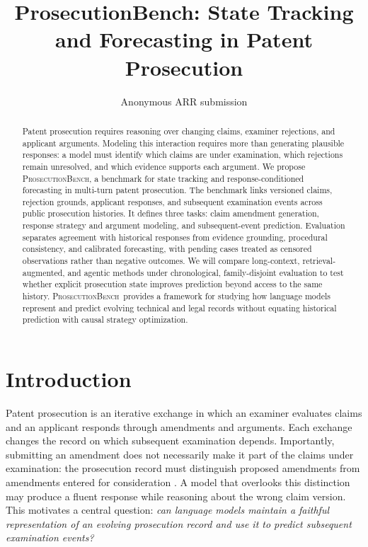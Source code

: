\documentclass[11pt]{article}
\title{ProsecutionBench: State Tracking and Forecasting in Patent Prosecution}
\author{Anonymous ARR submission}
\newcommand{\bench}{\textsc{ProsecutionBench}}
\begin{document}
\maketitle

\begin{abstract}
Patent prosecution requires reasoning over changing claims, examiner rejections, and applicant arguments. Modeling this interaction requires more than generating plausible responses: a model must identify which claims are under examination, which rejections remain unresolved, and which evidence supports each argument. We propose \bench, a benchmark for state tracking and response-conditioned forecasting in multi-turn patent prosecution. The benchmark links versioned claims, rejection grounds, applicant responses, and subsequent examination events across public prosecution histories. It defines three tasks: claim amendment generation, response strategy and argument modeling, and subsequent-event prediction. Evaluation separates agreement with historical responses from evidence grounding, procedural consistency, and calibrated forecasting, with pending cases treated as censored observations rather than negative outcomes. We will compare long-context, retrieval-augmented, and agentic methods under chronological, family-disjoint evaluation to test whether explicit prosecution state improves prediction beyond access to the same history. \bench\ provides a framework for studying how language models represent and predict evolving technical and legal records without equating historical prediction with causal strategy optimization.
\end{abstract}

\section{Introduction}
\label{sec:introduction}

Patent prosecution is an iterative exchange in which an examiner evaluates claims and an applicant responds through amendments and arguments. Each exchange changes the record on which subsequent examination depends. Importantly, submitting an amendment does not necessarily make it part of the claims under examination: the prosecution record must distinguish proposed amendments from amendments entered for consideration \citep{usptompep714}. A model that overlooks this distinction may produce a fluent response while reasoning about the wrong claim version. This motivates a central question: \emph{can language models maintain a faithful representation of an evolving prosecution record and use it to predict subsequent examination events?}
\end{document}

